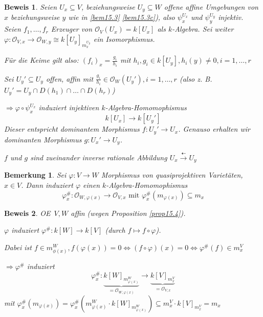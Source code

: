 \documentclass[a4paper, 12pt, numbers=noendperiod, chapterprefix=true, headsepline]{scrbook}
\theoremstyle{break}
\newtheorem{Bem}[Def]{Bemerkung}
\theoremstyle{nonumberbreak}
\newtheorem{Bew}{Beweis}
\theoremstyle{nonumberplain}
\newcommand{\calO}{\mathcal{O}}
\renewcommand{\OE}{O\!\!E~}
\begin{document}
\begin{Bew}
Seien $U_x\subseteq V$, beziehungsweise $U_y\subseteq W$ offene affine Umgebungen von $x$ beziehungsweise $y$ wie in \ref{bem15.3} \ref{bem15.3c}), also $\psi_x^{U_x}$ und $\psi_y^{U_y}$ injektiv. Seien $f_1,\ldots ,f_r$ Erzeuger von $\calO_V(U_x)=k[U_x]$ als $k$-Algebra. Sei weiter $\varphi:\calO_{V,x}\to\calO_{W,y}\cong k[U_y]_{m_x^{U_y}}$ ein Isomorphismus.

F\"ur die Keime gilt also: $(f_i)_x=\frac{g_i}{h_i}$ mit $h_i, g_i \in k[U_y], h_i(y)\ne 0, i=1,\ldots ,r$

Sei $U_y' \subseteq U_y$ offen, affin mit $\frac{g_i}{h_i}\in\calO_W(U_y'), i=1,\ldots ,r$ (also z. B. $U_y'=U_y\cap D(h_1)\cap\ldots \cap D(h_r)$)

$\Rightarrow \varphi\circ\psi_x^{U_x}$ induziert injektiven $k$-Algebra-Homomophismus
	\[k[U_x]\to k[U_y']\]
Dieser entspricht dominantem Morphismus $f:U_y'\to U_x$. Genauso erhalten wir dominanten Morphismus $g:U_x'\to U_y$.

$f$ und $g$ sind zueinander inverse rationale Abbildung $U_x \overset{\dashleftarrow}{\to} U_y$ %
\end{Bew}

\begin{Bem}
Sei $\varphi: V\to W$ Morphismus von quasiprojektiven Variet\"aten, $x\in V$. Dann induziert $\varphi$ einen $k$-Algebra-Homomophismus
	\[\varphi_x^{\#}:\calO_{W,\varphi(x)}\to\calO_{V,x} \text{ mit } \varphi_x^{\#}(m_{\varphi(x)})\subseteq m_x\]
\end{Bem}

\begin{Bew}
\OE $V,W$ affin (wegen Proposition \ref{prop15.4}).

$\varphi$ induziert $\varphi^\#:k[W]\to k[V]$ (durch $f\mapsto f\circ\varphi$).

Dabei ist $f\in m_{\phi(x)}^W, f(\varphi(x))=0 \Leftrightarrow (f\circ\varphi)(x)=0 \Leftrightarrow \varphi^\#(f)\in m_x^V$

$\Rightarrow \varphi^\#$ induziert
	\[ \varphi_x^\#: \underbrace{k[W]_{m_{\varphi(x)}^W}}_{=\calO_{W,\varphi(x)}} \to \underbrace{k[V]_{m_x^V}}_{=\calO_{V,x}}\]
mit $\varphi_x^\#(m_{\varphi(x)}) = \varphi_x^\#(m_{\varphi(x)}^W \cdot k[W]_{m_{\varphi(x)}^W}) \subseteq m_x^V \cdot k[V]_{m_x^V} = m_x$
\end{Bew}

\newpage

\end{document}
